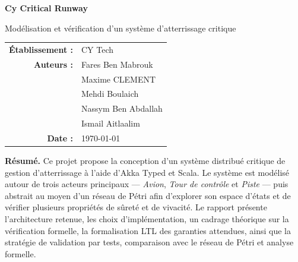\documentclass[11pt,a4paper]{article}
\begin{document}
\begin{titlepage}
    \centering
    \vspace*{2cm}

    {\Huge\bfseries\color{accent} Cy Critical Runway \par}
    \vspace{0.5cm}
    {\Large Modélisation et vérification d'un système d'atterrissage critique \par}
    \vspace{1.2cm}


    \vfill

    \begin{tabular}{rl}
        \textbf{Établissement :} & CY Tech \\
        \textbf{Auteurs :} & Fares Ben Mabrouk \\
                           & Maxime CLEMENT \\
                           & Mehdi Boulaich \\
                           & Nassym Ben Abdallah \\
                           & Ismail Aitlaalim \\
        \textbf{Date :} & \today
    \end{tabular}

    \vfill

    \begin{minipage}{0.9\textwidth}
        \small
        \textbf{Résumé.} Ce projet propose la conception d'un système distribué critique de gestion d'atterrissage à l'aide d'Akka Typed et Scala. Le système est modélisé autour de trois acteurs principaux --- \emph{Avion}, \emph{Tour de contrôle} et \emph{Piste} --- puis abstrait au moyen d'un réseau de Pétri afin d'explorer son espace d'états et de vérifier plusieurs propriétés de sûreté et de vivacité. Le rapport présente l'architecture retenue, les choix d'implémentation, un cadrage théorique sur la vérification formelle, la formalisation LTL des garanties attendues, ainsi que la stratégie de validation par tests, comparaison avec le réseau de Pétri et analyse formelle.
    \end{minipage}
\end{titlepage}
\end{document}

